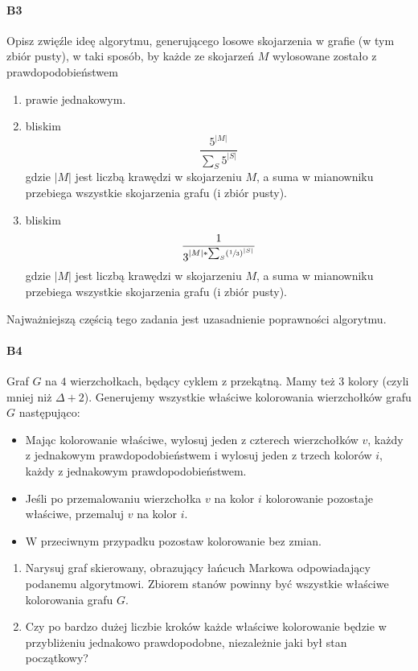 \documentclass[a4paper,12pt]{article}
\theoremstyle{definition}%
\theoremstyle{definition}
\theoremstyle{problem}
\begin{document}
\paragraph{B3} Opisz zwięźle ideę algorytmu, generującego losowe skojarzenia w grafie (w tym zbiór pusty), w taki sposób, by każde ze skojarzeń $M$ wylosowane zostało z prawdopodobieństwem
\begin{enumerate}[label=\alph*)]
\item prawie jednakowym.
\item  bliskim
$$\frac{5^{|M|}}{\sum _S 5^{|S|}}$$
gdzie $|M|$ jest liczbą krawędzi w skojarzeniu $M$, a suma w mianowniku przebiega wszystkie skojarzenia
grafu (i zbiór pusty).
\item bliskim 
$$\frac{1}{3^{|M|*\sum _S\left(\sfrac{1}{3}\right)^{|S|}}}$$
gdzie $|M|$ jest liczbą krawędzi w skojarzeniu $M$, a suma w mianowniku przebiega wszystkie skojarzenia
grafu (i zbiór pusty). 
\end{enumerate}
Najważniejszą częścią tego zadania jest uzasadnienie poprawności algorytmu.

\paragraph{B4} Graf $G$ na $4$ wierzchołkach, będący cyklem z przekątną. Mamy też 3 kolory (czyli mniej niż $\Delta + 2$). Generujemy wszystkie właściwe kolorowania wierzchołków grafu $G$ następująco:
\begin{itemize}
\item Mając kolorowanie właściwe, wylosuj jeden z czterech wierzchołków $v$, każdy z jednakowym prawdopodobieństwem i wylosuj jeden z trzech kolorów $i$, każdy z jednakowym prawdopodobieństwem.
\item Jeśli po przemalowaniu wierzchołka $v$ na kolor $i$ kolorowanie pozostaje właściwe, przemaluj $v$ na kolor $i$.
\item W przeciwnym przypadku pozostaw kolorowanie bez zmian.
\end{itemize}
\begin{enumerate}[label=\alph*)]
\item Narysuj graf skierowany, obrazujący łańcuch Markowa odpowiadający podanemu algorytmowi. Zbiorem
stanów powinny być wszystkie właściwe kolorowania grafu $G$.
\item Czy po bardzo dużej liczbie kroków każde właściwe kolorowanie będzie w przybliżeniu jednakowo prawdopodobne, niezależnie jaki był stan początkowy?
\end{enumerate}
\end{document}
